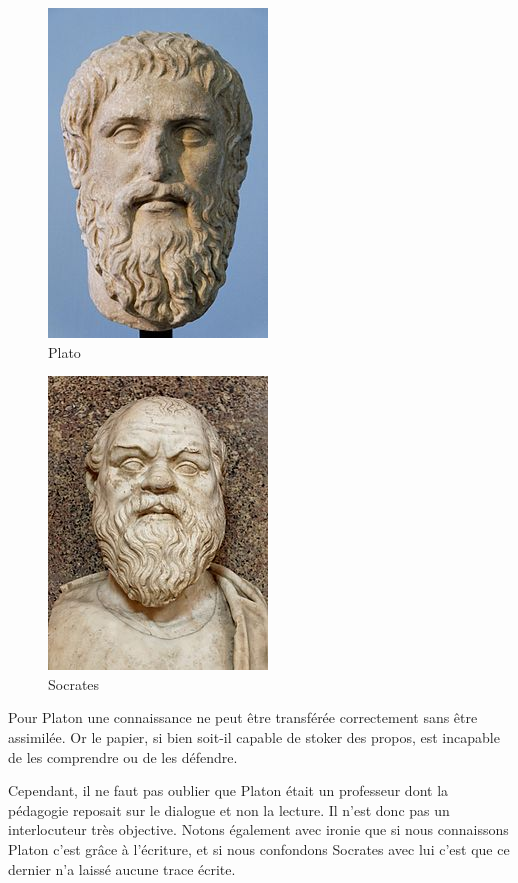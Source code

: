 \begin{minipage}[H]{0.49\linewidth}
  \begin{figure}[H]
  \centering
  \includegraphics[height=0.15\paperheight]{../resources/illustrations/plato2}
  \caption{Plato}
  \end{figure}
\end{minipage}
\begin{minipage}[H]{0.49\linewidth}
  \begin{figure}[H]
  \centering
  \includegraphics[height=0.15\paperheight]{../resources/illustrations/socrates}
  \caption{Socrates}
  \end{figure}
\end{minipage}

Pour Platon une connaissance ne peut être transférée correctement sans être assimilée. Or le papier, si bien soit-il capable de stoker des propos, est incapable de les comprendre ou de les défendre.

Cependant, il ne faut pas oublier que Platon était un professeur dont la pédagogie reposait sur le dialogue et non la lecture. Il n'est donc pas un interlocuteur très objective. Notons également avec ironie que si nous connaissons Platon c'est grâce à l'écriture, et si nous confondons Socrates avec lui c'est que ce dernier n'a laissé aucune trace écrite.

